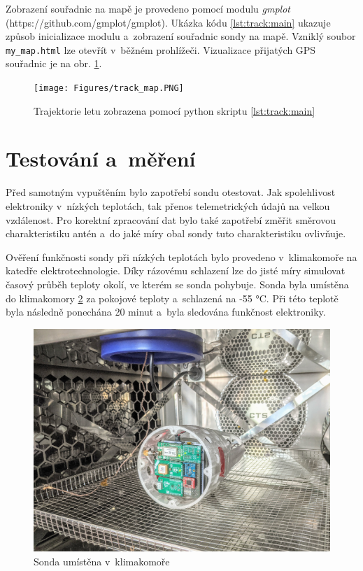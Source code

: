 \documentclass[twoside]{ctuthesis}
\theoremstyle{plain}
\theoremstyle{definition}
\theoremstyle{note}
\begin{document}
	

	Zobrazení souřadnic na mapě je provedeno pomocí modulu \textit{gmplot} (https://github.com/gmplot/gmplot). Ukázka kódu \ref{lst:track:main} ukazuje způsob inicializace modulu a~zobrazení souřadnic sondy na mapě. Vzniklý soubor \lstinline|my_map.html| lze otevřít v~běžném prohlížeči. Vizualizace přijatých GPS souřadnic je na obr. \ref{fig:track:map}.

	

	\begin{figure}[hbtp]
		\centering
		\texttt{[image: Figures/track\_map.PNG]}
		\caption{Trajektorie letu zobrazena pomocí python skriptu \ref{lst:track:main}}
		\label{fig:track:map}
	\end{figure}










	\section{Testování a~měření}
	Před samotným vypuštěním bylo zapotřebí sondu otestovat. Jak spolehlivost elektroniky v~nízkých teplotách, tak přenos telemetrických údajů na velkou vzdálenost. Pro korektní zpracování dat bylo také zapotřebí změřit směrovou charakteristiku antén a~do jaké míry obal sondy tuto charakteristiku ovlivňuje.

	Ověření funkčnosti sondy při nízkých teplotách bylo provedeno v~klimakomoře na katedře elektrotechnologie. Díky rázovému schlazení lze do jisté míry simulovat časový průběh teploty okolí, ve kterém se sonda pohybuje. Sonda byla umístěna do klimakomory \ref{fig:sonda:klimakomora} za pokojové teploty a~schlazená na -55 °C. Při této teplotě byla následně ponechána 20 minut a~byla sledována funkčnost elektroniky.

	\begin{figure}[hbtp]
		\centering
		\includegraphics[width=.7\textwidth]{Figures/sonda_klimakomora.jpg}
		\caption{Sonda umístěna v~klimakomoře}
		\label{fig:sonda:klimakomora}
	\end{figure}
\end{document}
